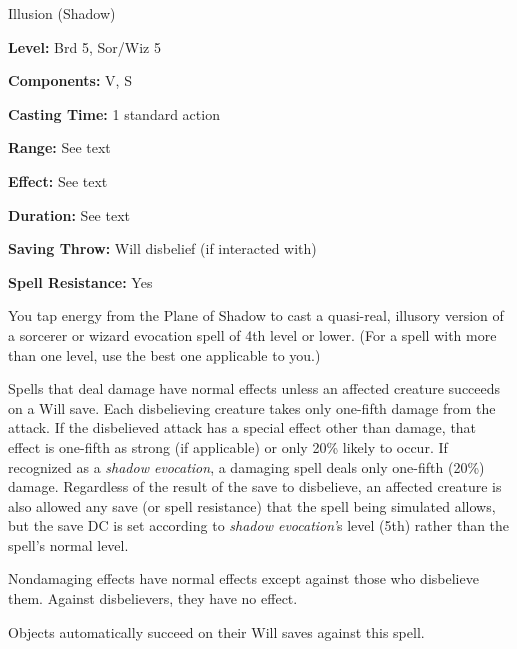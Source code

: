 
Illusion (Shadow)

\textbf{Level:} Brd 5, Sor/Wiz 5

\textbf{Components:} V, S

\textbf{Casting Time:} 1 standard action

\textbf{Range:} See text

\textbf{Effect:} See text

\textbf{Duration:} See text

\textbf{Saving Throw:} Will disbelief (if interacted with)

\textbf{Spell Resistance:} Yes

You tap energy from the Plane of Shadow to cast a quasi-real, illusory version 
of a sorcerer or wizard evocation spell of 4th level or lower. (For a spell with 
more than one level, use the best one applicable to you.)

Spells that deal damage have normal effects unless an affected creature succeeds 
on a Will save. Each disbelieving creature takes only one-fifth damage from the 
attack. If the disbelieved attack has a special effect other than damage, that 
effect is one-fifth as strong (if applicable) or only 20\% likely to occur. If 
recognized as a \textit{shadow evocation}, a damaging spell deals only one-fifth 
(20\%) damage. Regardless of the result of the save to disbelieve, an affected 
creature is also allowed any save (or spell resistance) that the spell being simulated 
allows, but the save DC is set according to \textit{shadow evocation'}s level (5th) 
rather than the spell's normal level.

Nondamaging effects have normal effects except against those who disbelieve them. 
Against disbelievers, they have no effect.

Objects automatically succeed on their Will saves against this spell.

